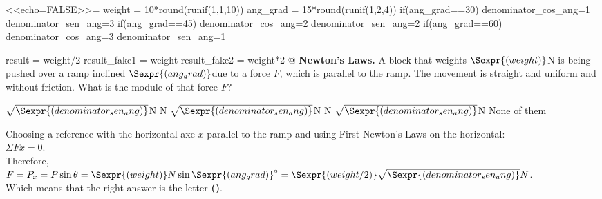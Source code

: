 \begin{problem}[h]
<<echo=FALSE>>=
weight = 10*round(runif(1,1,10))
ang_grad = 15*round(runif(1,2,4))
if(ang_grad==30){
  denominator_cos_ang=1 
  denominator_sen_ang=3}
if(ang_grad==45){
  denominator_cos_ang=2
  denominator_sen_ang=2}
if(ang_grad==60){
  denominator_cos_ang=3
  denominator_sen_ang=1}

result = weight/2
result_fake1 = weight
result_fake2 = weight*2
@
{\bf Newton's Laws.} A block that weights $\Sexpr{(weight)}$N is being pushed over a ramp inclined $\Sexpr{(ang_grad)}$\textdegree due to a force $F$, which is parallel to the ramp. The movement is straight and uniform and without friction. What is the module of that force $F$?
\begin{answers}{3}
    \bChoices[random] 
    \label{resp4.1}$\sqrt{\Sexpr{(denominator_sen_ang)}}$N\eAns
     N\eAns
     $\sqrt{\Sexpr{(denominator_sen_ang)}}$N\eAns
     N\eAns
     $\sqrt{\Sexpr{(denominator_sen_ang)}}$N\eAns
    \eFreeze
     None of them\eAns
    \eChoices
\end{answers}
\begin{solution}
Choosing a reference with the horizontal axe $x$ parallel to the ramp and using First Newton's Laws on the horizontal:\\
$\Sigma F{x} = 0$.\\
Therefore,\\
$F = P_x = P \sin \theta = \Sexpr{(weight)}N\sin \Sexpr{(ang_grad)}^{\circ} = \Sexpr{(weight/2)}\sqrt{\Sexpr{(denominator_sen_ang)}}N$.\\
Which means that the right answer is the letter \textbf{()}.
\end{solution}
\end{problem}